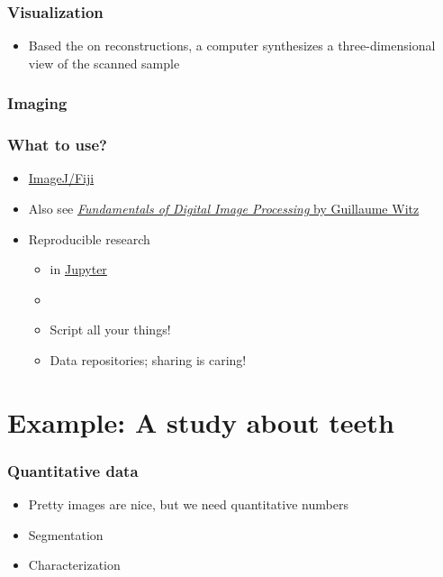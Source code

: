 \begin{frame}
  \frametitle{Visualization}
  \begin{itemize}
    \item Based the on reconstructions, a computer synthesizes a three-dimensional view of the scanned sample
  \end{itemize}
\end{frame}

\begin{frame}
  \frametitle{Imaging}
  \centering
\end{frame}

\begin{frame}
  \frametitle{What to use?}
  \begin{itemize}
    \item \href{http://fiji.sc/}{ImageJ/Fiji}~\cite{Schindelin2012}
    \item Also see \href{https://ilias.unibe.ch/goto_ilias3_unibe_sess_3022928.html}{\emph{Fundamentals of Digital Image Processing} by Guillaume Witz}
    \item Reproducible research
      \begin{itemize}
        \item \href{https://www.python.org/}{\faPython} in \href{https://jupyter.org/}{Jupyter}~\cite{Kluyver2016}
        \item \href{https://git-scm.com/}{\faGit}
        \item Script all your things!
        \item Data repositories; \ie{} sharing is caring!
      \end{itemize}
  \end{itemize}
\end{frame}

\section{Example: A study about teeth}
\begin{frame}
  \frametitle{Quantitative data}
  \begin{itemize}
    \item Pretty images are nice, but we need quantitative numbers
    \item Segmentation
    \item Characterization
  \end{itemize}
\end{frame}

